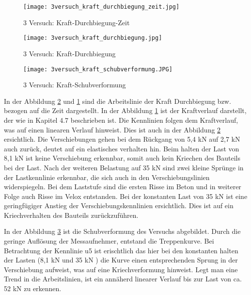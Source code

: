 \documentclass[12 pt,a4 paper ]{scrreprt}
\begin{document}
\begin{figure}
	\texttt{[image: 3versuch\_kraft\_durchbiegung\_zeit.jpg]}
	\caption{3 Versuch: Kraft-Durchbiegung-Zeit}
	\label{3 Versuch: Kraft-Durchbiegung-Zeit}
\end{figure}




\begin{figure}	
	\texttt{[image: 3versuch\_kraft\_durchbiegung.jpg]}
	\caption{3 Versuch: Kraft-Durchbiegung}
	\label{3 Versuch: Kraft-Durchbiegung}
\end{figure}





\begin{figure}	
	\texttt{[image: 3versuch\_kraft\_schubverformung.JPG]}
	\caption{3 Versuch: Kraft-Schubverformung}
	\label{3 Versuch: Kraft-Schubverformung}
\end{figure}



In der Abbildung \ref{3 Versuch: Kraft-Durchbiegung} und \ref{3 Versuch: Kraft-Durchbiegung-Zeit} sind die Arbeitslinie der Kraft Durchbiegung bzw. bezogen auf die Zeit dargestellt. In der Abbildung \ref{3 Versuch: Kraft-Durchbiegung-Zeit} ist der Kraftverlauf darstellt, der wie in Kapitel 4.7 beschrieben ist. Die Kennlinien folgen dem Kraftverlauf, was auf einen linearen Verlauf hinweist. Dies ist auch in der Abbildung \ref{3 Versuch: Kraft-Durchbiegung} ersichtlich. Die Verschiebungen gehen bei dem Rückgang von 5,4 kN auf 2,7 kN auch zurück, deutet auf ein elastisches verhalten hin. Beim halten der Last von 8,1 kN ist keine Verschiebung erkennbar, somit auch kein Kriechen des Bauteils bei der Last. Nach der weiteren Belastung auf 35 kN sind zwei kleine Sprünge in der Lastkennlinie erkennbar, die sich auch in den Verschiebungslinien widerspiegeln. Bei dem Laststufe sind die ersten Risse im Beton und in weiterer Folge auch Risse im Velox entstanden. Bei der konstanten Last von 35 kN ist eine geringfügiger Anstieg  der Verschiebungskennlinien ersichtlich. Dies ist auf ein Kriechverhalten des Bauteils zurückzuführen.




In der Abbildung \ref{3 Versuch: Kraft-Schubverformung} ist die Schubverformung des Versuchs abgebildet. Durch die geringe Auflösung der Messaufnehmer, entstand die Treppenkurve. Bei Betrachtung der Kennlinie u5 ist erischtlich das hier bei den konstanten halten der Lasten (8,1 kN und 35 kN ) die Kurve einen entsprechenden Sprung in der Verschiebung aufweist, was auf eine Kriechverformung hinweist. Legt man eine Trend in die Arbeitslinien, ist ein annäherd linearer Verlauf bis zur Last von ca. 52 kN zu erkennen. 
\end{document}
